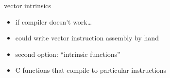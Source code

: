 \begin{frame}[fragile,label=vecIntr]{vector intrinsics}
\begin{itemize}
    \item if compiler doesn't work\ldots
    \item could write vector instruction assembly by hand
    \vspace{.5cm}
    \item second option: ``intrinsic functions''
    \item C functions that compile to particular instructions
\end{itemize}
\end{frame}
